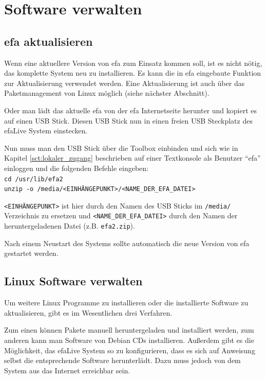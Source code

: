 \documentclass[a4paper,12pt,twoside]{article}
\begin{document}
\section{Software verwalten}
\label{sct:software_verwalten}
\subsection{efa aktualisieren}
\label{update_efa}
Wenn eine aktuellere Version von efa zum Einsatz kommen soll, ist es
nicht nötig, das komplette System neu zu installieren. Es kann die in
efa eingebaute Funktion zur Aktualisierung verwendet werden. Eine 
Aktualisierung ist auch über das Paketmanagement von Linux möglich (siehe
nächster Abschnitt).

Oder man lädt das aktuelle efa von der efa Internetseite \cite{EFA1}
herunter und kopiert es auf einen USB Stick. Diesen USB Stick nun in
einen freien USB Steckplatz des efaLive System einstecken. 

Nun muss man den USB Stick über die Toolbox einbinden und sich wie in
Kapitel \ref{sct:lokaler_zugang} beschrieben auf einer Textkonsole als Benutzer
"`efa"' einloggen und die folgenden Befehle eingeben:
\bigskip
\\
\texttt{cd /usr/lib/efa2\\
unzip -o /media/{\textless}EINHÄNGEPUNKT{\textgreater}/{\textless}NAME\_DER\_EFA\_DATEI{\textgreater}}

\bigskip
\texttt{{\textless}EINHÄNGEPUNKT{\textgreater}} ist hier durch den Namen des USB
Sticks im \texttt{/media/} Verzeichnis zu ersetzen und \texttt{{\textless}NAME\_DER\_EFA\_DATEI{\textgreater}} 
durch den Namen der heruntergeladenen Datei (z.B. \texttt{efa2.zip}).

Nach einem Neustart des Systems sollte automatisch die neue Version von
efa gestartet werden.


\subsection{Linux Software verwalten}
\label{sct:linux_software}
Um weitere Linux Programme zu installieren oder die installierte
Software zu aktualisieren, gibt es im Wesentlichen
drei Verfahren. 

Zum einen können Pakete manuell heruntergeladen und installiert werden,
zum anderen kann man Software von Debian CDs installieren. Außerdem
gibt es die Möglichkeit, das efaLive System so zu konfigurieren, dass
es sich auf Anweisung selbst die entsprechende Software herunterlädt.
Dazu muss jedoch von dem System aus das Internet erreichbar sein.
\end{document}
